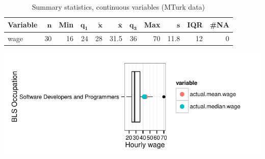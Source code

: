 \documentclass[a4paper,10pt]{article}\usepackage[]{graphicx}\usepackage[]{color}
\makeatletter
\def\maxwidth{ %
  \ifdim\Gin@nat@width>\linewidth
    \linewidth
  \else
    \Gin@nat@width
  \fi
}
\makeatother
\begin{document}
\begin{table}[ht]
\centering
{\footnotesize
\begin{tabular}{lrrrrrrrrrr}
 \textbf{Variable} & $\mathbf{n}$ & \textbf{Min} & $\mathbf{q_1}$ & $\mathbf{\widetilde{x}}$ & $\mathbf{\bar{x}}$ & $\mathbf{q_3}$ & \textbf{Max} & $\mathbf{s}$ & \textbf{IQR} & \textbf{\#NA} \\ 
  \hline
wage & 30 & 16 & 24 & 28 & 31.5 & 36 & 70 & 11.8 & 12 & 0 \\ 
  \end{tabular}
}
\caption{Summary statistics, continuous variables (MTurk data)} 
\label{tab2:15-1130}
\end{table}


{\centering \includegraphics[width=\maxwidth]{figure/unnamed-chunk-220} 

}
\end{document}
